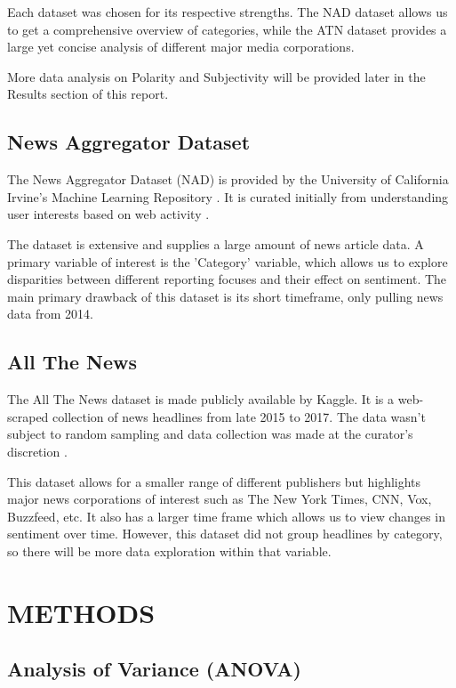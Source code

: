 \documentclass[12pt]{article}
\begin{document}
Each dataset was chosen for its respective strengths. The NAD dataset allows us to get a comprehensive overview of categories, while the ATN dataset provides a large yet concise analysis of different major media corporations. 

More data analysis on Polarity and Subjectivity will be provided later in the Results section of this report.

\subsection{News Aggregator Dataset}

The News Aggregator Dataset (NAD) is provided by the University of California Irvine's Machine Learning Repository \cite{dua2019}. It is curated initially from understanding user interests based on web activity \cite{gasparetti2016}. 

The dataset is extensive and supplies a large amount of news article data. A primary variable of interest is the 'Category' variable, which allows us to explore disparities between different reporting focuses and their effect on sentiment. The main primary drawback of this dataset is its short timeframe, only pulling news data from 2014. 

\subsection{All The News}

The All The News dataset is made publicly available by Kaggle. It is a web-scraped collection of news headlines from late 2015 to 2017. The data wasn't subject to random sampling and data collection was made at the curator's discretion \cite{thompson2017}.

This dataset allows for a smaller range of different publishers but highlights major news corporations of interest such as The New York Times, CNN, Vox, Buzzfeed, etc. It also has a larger time frame which allows us to view changes in sentiment over time. However, this dataset did not group headlines by category, so there will be more data exploration within that variable. 

\section{METHODS}

\subsection{Analysis of Variance (ANOVA)}
\end{document}
